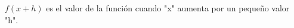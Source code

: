 \documentclass[preview]{standalone}
\begin{document}
\begin{center}
$f(x + h)$ es el valor de la función cuando "x" aumenta por un pequeño valor "h".
\end{center}
\end{document}
